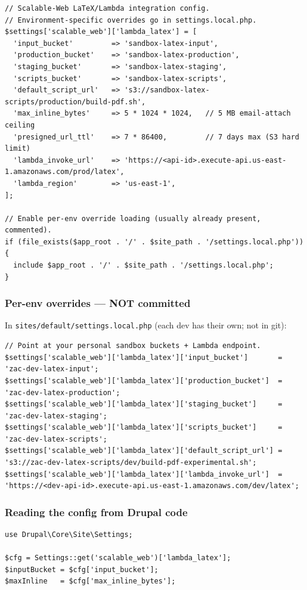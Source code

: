 \documentclass[11pt,letterpaper]{article}
\begin{document}
\begin{lstlisting}[style=worxcode,language=php-like]
// Scalable-Web LaTeX/Lambda integration config.
// Environment-specific overrides go in settings.local.php.
$settings['scalable_web']['lambda_latex'] = [
  'input_bucket'         => 'sandbox-latex-input',
  'production_bucket'    => 'sandbox-latex-production',
  'staging_bucket'       => 'sandbox-latex-staging',
  'scripts_bucket'       => 'sandbox-latex-scripts',
  'default_script_url'   => 's3://sandbox-latex-scripts/production/build-pdf.sh',
  'max_inline_bytes'     => 5 * 1024 * 1024,   // 5 MB email-attach ceiling
  'presigned_url_ttl'    => 7 * 86400,         // 7 days max (S3 hard limit)
  'lambda_invoke_url'    => 'https://<api-id>.execute-api.us-east-1.amazonaws.com/prod/latex',
  'lambda_region'        => 'us-east-1',
];

// Enable per-env override loading (usually already present, commented).
if (file_exists($app_root . '/' . $site_path . '/settings.local.php')) {
  include $app_root . '/' . $site_path . '/settings.local.php';
}
\end{lstlisting}

\subsubsection{Per-env overrides — NOT committed}
In \texttt{sites/default/settings.local.php} (each dev has their own; not in git):

\begin{lstlisting}[style=worxcode,language=php-like]
// Point at your personal sandbox buckets + Lambda endpoint.
$settings['scalable_web']['lambda_latex']['input_bucket']       = 'zac-dev-latex-input';
$settings['scalable_web']['lambda_latex']['production_bucket']  = 'zac-dev-latex-production';
$settings['scalable_web']['lambda_latex']['staging_bucket']     = 'zac-dev-latex-staging';
$settings['scalable_web']['lambda_latex']['scripts_bucket']     = 'zac-dev-latex-scripts';
$settings['scalable_web']['lambda_latex']['default_script_url'] = 's3://zac-dev-latex-scripts/dev/build-pdf-experimental.sh';
$settings['scalable_web']['lambda_latex']['lambda_invoke_url']  = 'https://<dev-api-id>.execute-api.us-east-1.amazonaws.com/dev/latex';
\end{lstlisting}

\subsubsection{Reading the config from Drupal code}
\begin{lstlisting}[style=worxcode,language=php-like]
use Drupal\Core\Site\Settings;

$cfg = Settings::get('scalable_web')['lambda_latex'];
$inputBucket = $cfg['input_bucket'];
$maxInline   = $cfg['max_inline_bytes'];
\end{lstlisting}
\end{document}
